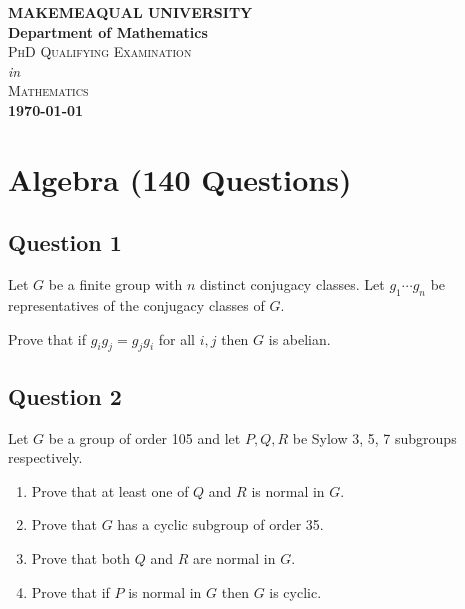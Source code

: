 \documentclass[12pt]{article}
\begin{document}
\begin{titlepage}
	\begin{center}
        \textbf{\LARGE{MAKEMEAQUAL UNIVERSITY}} \\
                \vspace{2mm} %
            \textbf{\Large{Department of Mathematics}}\\
                \vspace{15mm} %
            \LARGE\textsc{PhD Qualifying Examination} \\
                \vspace{2mm} %
            \Large \textit{in} \\
            \Large\textsc {Mathematics}\\
                \vspace{30mm} %
            \textbf{\LARGE{\today}}
    \end{center}
\end{titlepage}

\hypertarget{algebra-140-questions}{%
\section{Algebra (140 Questions)}\label{algebra-140-questions}}

\hypertarget{question-1}{%
\subsection{Question 1}\label{question-1}}

Let \(G\) be a finite group with \(n\) distinct conjugacy classes. Let
\(g_1 \cdots g_n\) be representatives of the conjugacy classes of \(G\).

Prove that if \(g_i g_j = g_j g_i\) for all \(i, j\) then \(G\) is
abelian.

\hypertarget{question-2}{%
\subsection{Question 2}\label{question-2}}

Let \(G\) be a group of order 105 and let \(P, Q, R\) be Sylow 3, 5, 7
subgroups respectively.

\begin{enumerate}
\def\labelenumi{(\alph{enumi})}
\item
  Prove that at least one of \(Q\) and \(R\) is normal in \(G\).
\item
  Prove that \(G\) has a cyclic subgroup of order 35.
\item
  Prove that both \(Q\) and \(R\) are normal in \(G\).
\item
  Prove that if \(P\) is normal in \(G\) then \(G\) is cyclic.
\end{enumerate}
\end{document}
